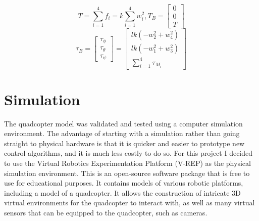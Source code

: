 \documentclass[letterpaper,12pt,titlepage,oneside,final]{book}
\begin{document}
\begin{equation} \label{eq:thrust}
T = \sum_{i=1}^{4} f_{i} = k\sum_{i=1}^{4} w^{2}_{i} , T_{B} = 
\begin{bmatrix}
0 \\
0 \\
T
\end{bmatrix}
\end{equation}
\begin{equation} \label{eq:torque}
\tau_{B} = 
\begin{bmatrix}
\tau_{\phi} \\
\tau_{\theta} \\
\tau_{\psi}
\end{bmatrix}
=
\begin{bmatrix}
lk(-w_{2}^{2}+w_{4}^{2}) \\
lk(-w_{1}^{2}+w_{3}^{2}) \\
\sum_{i=1}^{4}\tau_{M_{i}}
\end{bmatrix}
\end{equation}


\section{Simulation}



The quadcopter model was validated and tested using a computer simulation environment. 
The advantage of starting with a simulation rather than going straight to physical hardware is that it is quicker and easier to prototype new control algorithms, and it is much less costly to do so. 
For this project I decided to use the Virtual Robotics Experimentation Platform (V-REP)\cite{vrep} as the physical simulation environment.
This is an open-source software package that is free to use for educational purposes. 
It contains models of various robotic platforms, including a model of a quadcopter. 
It allows the construction of intricate 3D virtual environments for the quadcopter to interact with, as well as many virtual sensors that can be equipped to the quadcopter, such as cameras.
\end{document}
